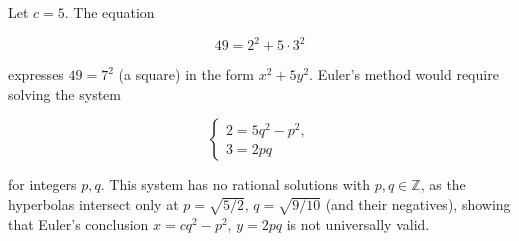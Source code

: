 Let $c = 5$. The equation

$$
49 = 2^2 + 5 \cdot 3^2
$$

expresses $49 = 7^2$ (a square) in the form $x^2 + 5y^2$. Euler's method would require solving the system

$$
\begin{cases}
2 = 5q^2 - p^2, \\
3 = 2pq
\end{cases}
$$

for integers $p, q$. This system has no rational solutions with $p, q \in \mathbb{Z}$, as the hyperbolas intersect only at $p = \sqrt{5/2}$, $q = \sqrt{9/10}$ (and their negatives), showing that Euler's conclusion $x = cq^2 - p^2$, $y = 2pq$ is not universally valid.
